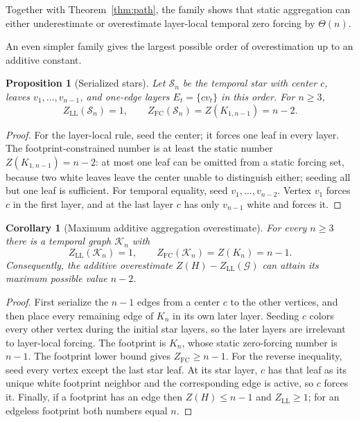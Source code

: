 \documentclass[11pt]{article}
\newtheorem{proposition}[theorem]{Proposition}
\newtheorem{corollary}[theorem]{Corollary}
\theoremstyle{definition}
\theoremstyle{remark}
\newcommand{\calG}{\mathcal{G}}
\newcommand{\calS}{\mathcal{S}}
\newcommand{\calK}{\mathcal{K}}
\newcommand{\LL}{\mathrm{LL}}
\newcommand{\FC}{\mathrm{FC}}
\begin{document}
Together with Theorem~\ref{thm:path}, the family shows that static
aggregation can either underestimate or overestimate layer-local temporal
zero forcing by $\Theta(n)$.

An even simpler family gives the largest possible order of overestimation up
to an additive constant.

\begin{proposition}[Serialized stars]\label{prop:star}
Let $\calS_n$ be the temporal star with center $c$, leaves
$v_1,\ldots,v_{n-1}$, and one-edge layers $E_t=\{cv_t\}$ in this order.
For $n\ge3$,
\[
 Z_{\LL}(\calS_n)=1,
 \qquad
 Z_{\FC}(\calS_n)=Z(K_{1,n-1})=n-2.
\]
\end{proposition}

\begin{proof}
For the layer-local rule, seed the center; it forces one leaf in every layer.
The footprint-constrained number is at least the static number
$Z(K_{1,n-1})=n-2$: at most one leaf can be omitted from a static forcing
set, because two white leaves leave the center unable to distinguish either;
seeding all but one leaf is sufficient.  For temporal equality, seed
$v_1,\ldots,v_{n-2}$.  Vertex $v_1$ forces $c$ in the first layer, and at the
last layer $c$ has only $v_{n-1}$ white and forces it.
\end{proof}

\begin{corollary}[Maximum additive aggregation overestimate]\label{cor:maxgap}
For every $n\ge3$ there is a temporal graph $\calK_n$ with
\[
 Z_{\LL}(\calK_n)=1,
 \qquad
 Z_{\FC}(\calK_n)=Z(K_n)=n-1.
\]
Consequently, the additive overestimate
$Z(H)-Z_{\LL}(\calG)$ can attain its maximum possible value $n-2$.
\end{corollary}

\begin{proof}
First serialize the $n-1$ edges from a center $c$ to the other vertices, and
then place every remaining edge of $K_n$ in its own later layer.  Seeding $c$
colors every other vertex during the initial star layers, so the later layers
are irrelevant to layer-local forcing.  The footprint is $K_n$, whose static
zero-forcing number is $n-1$.  The footprint lower bound gives
$Z_{\FC}\ge n-1$.  For the reverse inequality, seed every vertex except the
last star leaf.  At its star layer, $c$ has that leaf as its unique white
footprint neighbor and the corresponding edge is active, so $c$ forces it.
Finally, if a footprint has an edge then $Z(H)\le n-1$ and
$Z_{\LL}\ge1$; for an edgeless footprint both numbers equal $n$.
\end{proof}
\end{document}
